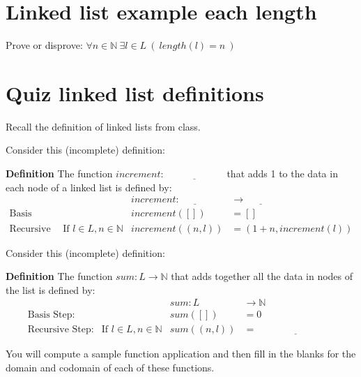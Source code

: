 \documentclass[12pt, oneside]{article}
\begin{document}
\section*{Linked list example each length}


Prove or disprove: $\forall n \in \mathbb{N} ~\exists l \in L ~(~length(l) = n~)$

\vspace{300pt} \vfill
\section*{Quiz linked list definitions}


Recall the definition of linked lists from class.

Consider this (incomplete) definition:

{\bf Definition} The function $\textit{increment} : \underline{\hspace{6em}}$ 
that adds 1 to the data in each node of a linked list is defined by:
\[
\begin{array}{llll}
& & \textit{increment} : \underline{\hspace{3em}} & \to \underline{\hspace{3em}} \\
\textrm{Basis Step:} & & \textit{increment}([]) & = [] \\
\textrm{Recursive Step:} & \textrm{If } l \in L, n \in \mathbb{N} & \textit{increment}((n, l)) & = (1 + n, \textit{increment}(l))
\end{array}
\]

Consider this (incomplete) definition:

{\bf Definition} The function $\textit{sum} : L \to \mathbb{N}$ that adds 
together all the data in nodes of the list is defined by:
\[
\begin{array}{llll}
& & \textit{sum} : L & \to \mathbb{N} \\
\textrm{Basis Step:} & & \textit{sum}([]) & = 0 \\
\textrm{Recursive Step:} & \textrm{If } l \in L, n \in \mathbb{N} & \textit{sum}((n, l)) & = \underline{\hspace{8em}}
\end{array}
\]

You will compute a sample function application and then fill in the 
blanks for the domain and codomain of each of these functions.
\end{document}
